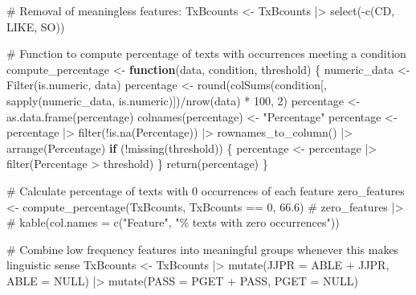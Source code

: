 \documentclass[
  letterpaper,
  DIV=11,
  numbers=noendperiod]{scrreprt}
\newenvironment{Shaded}{\begin{snugshade}}{\end{snugshade}}
\newcommand{\AttributeTok}[1]{\textcolor[rgb]{0.40,0.45,0.13}{#1}}
\newcommand{\CommentTok}[1]{\textcolor[rgb]{0.37,0.37,0.37}{#1}}
\newcommand{\ConstantTok}[1]{\textcolor[rgb]{0.56,0.35,0.01}{#1}}
\newcommand{\ControlFlowTok}[1]{\textcolor[rgb]{0.00,0.23,0.31}{\textbf{#1}}}
\newcommand{\DecValTok}[1]{\textcolor[rgb]{0.68,0.00,0.00}{#1}}
\newcommand{\FloatTok}[1]{\textcolor[rgb]{0.68,0.00,0.00}{#1}}
\newcommand{\FunctionTok}[1]{\textcolor[rgb]{0.28,0.35,0.67}{#1}}
\newcommand{\NormalTok}[1]{\textcolor[rgb]{0.00,0.23,0.31}{#1}}
\newcommand{\OtherTok}[1]{\textcolor[rgb]{0.00,0.23,0.31}{#1}}
\newcommand{\SpecialCharTok}[1]{\textcolor[rgb]{0.37,0.37,0.37}{#1}}
\newcommand{\StringTok}[1]{\textcolor[rgb]{0.13,0.47,0.30}{#1}}
\begin{document}
\begin{Shaded}
\begin{Highlighting}[]
\CommentTok{\# Removal of meaningless features:}
\NormalTok{TxBcounts }\OtherTok{\textless{}{-}}\NormalTok{ TxBcounts }\SpecialCharTok{|\textgreater{}}  
  \FunctionTok{select}\NormalTok{(}\SpecialCharTok{{-}}\FunctionTok{c}\NormalTok{(CD, LIKE, SO))}

\CommentTok{\# Function to compute percentage of texts with occurrences meeting a condition}
\NormalTok{compute\_percentage }\OtherTok{\textless{}{-}} \ControlFlowTok{function}\NormalTok{(data, condition, threshold) \{}
\NormalTok{  numeric\_data }\OtherTok{\textless{}{-}} \FunctionTok{Filter}\NormalTok{(is.numeric, data)}
\NormalTok{  percentage }\OtherTok{\textless{}{-}} \FunctionTok{round}\NormalTok{(}\FunctionTok{colSums}\NormalTok{(condition[, }\FunctionTok{sapply}\NormalTok{(numeric\_data, is.numeric)])}\SpecialCharTok{/}\FunctionTok{nrow}\NormalTok{(data) }\SpecialCharTok{*} \DecValTok{100}\NormalTok{, }\DecValTok{2}\NormalTok{)}
\NormalTok{  percentage }\OtherTok{\textless{}{-}} \FunctionTok{as.data.frame}\NormalTok{(percentage)}
  \FunctionTok{colnames}\NormalTok{(percentage) }\OtherTok{\textless{}{-}} \StringTok{"Percentage"}
\NormalTok{  percentage }\OtherTok{\textless{}{-}}\NormalTok{ percentage }\SpecialCharTok{|\textgreater{}}  
    \FunctionTok{filter}\NormalTok{(}\SpecialCharTok{!}\FunctionTok{is.na}\NormalTok{(Percentage)) }\SpecialCharTok{|\textgreater{}} 
    \FunctionTok{rownames\_to\_column}\NormalTok{() }\SpecialCharTok{|\textgreater{}} 
    \FunctionTok{arrange}\NormalTok{(Percentage)}
  \ControlFlowTok{if}\NormalTok{ (}\SpecialCharTok{!}\FunctionTok{missing}\NormalTok{(threshold)) \{}
\NormalTok{    percentage }\OtherTok{\textless{}{-}}\NormalTok{ percentage }\SpecialCharTok{|\textgreater{}}  
      \FunctionTok{filter}\NormalTok{(Percentage }\SpecialCharTok{\textgreater{}}\NormalTok{ threshold)}
\NormalTok{  \}}
  \FunctionTok{return}\NormalTok{(percentage)}
\NormalTok{\}}

\CommentTok{\# Calculate percentage of texts with 0 occurrences of each feature}
\NormalTok{zero\_features }\OtherTok{\textless{}{-}} \FunctionTok{compute\_percentage}\NormalTok{(TxBcounts, TxBcounts }\SpecialCharTok{==} \DecValTok{0}\NormalTok{, }\FloatTok{66.6}\NormalTok{)}
\CommentTok{\# zero\_features |\textgreater{} }
\CommentTok{\#   kable(col.names = c("Feature", "\% texts with zero occurrences"))}

\CommentTok{\# Combine low frequency features into meaningful groups whenever this makes linguistic sense}
\NormalTok{TxBcounts }\OtherTok{\textless{}{-}}\NormalTok{ TxBcounts }\SpecialCharTok{|\textgreater{}}  
  \FunctionTok{mutate}\NormalTok{(}\AttributeTok{JJPR =}\NormalTok{ ABLE }\SpecialCharTok{+}\NormalTok{ JJPR, }\AttributeTok{ABLE =} \ConstantTok{NULL}\NormalTok{) }\SpecialCharTok{|\textgreater{}}  
  \FunctionTok{mutate}\NormalTok{(}\AttributeTok{PASS =}\NormalTok{ PGET }\SpecialCharTok{+}\NormalTok{ PASS, }\AttributeTok{PGET =} \ConstantTok{NULL}\NormalTok{)}


\end{Highlighting}
\end{Shaded}
\end{document}
